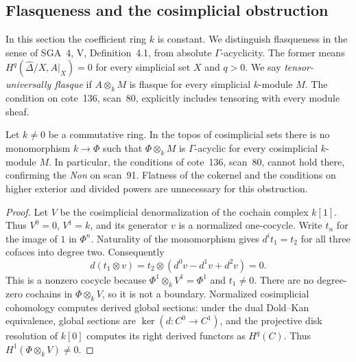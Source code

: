 \subsection{Flasqueness and the cosimplicial obstruction}

In this section the coefficient ring $k$ is constant. We distinguish
flasqueness in the sense of SGA~4, V, Definition~4.1, from absolute
$\Gamma$-acyclicity. The former means
$H^q(\widehat\Delta/X,A|_X)=0$ for every simplicial set $X$ and $q>0$.
We say \emph{tensor-universally flasque} if $A\otimes_k M$ is flasque
for every simplicial $k$-module $M$. The condition on cote~136,
scan~80, explicitly includes tensoring with every module sheaf.

\begin{theorem}\label{sa08:C01}
Let $k\ne0$ be a commutative ring. In the topos of cosimplicial sets
there is no monomorphism $k\to\Phi$ such that $\Phi\otimes_k M$ is
$\Gamma$-acyclic for every cosimplicial $k$-module $M$. In particular,
the conditions of cote~136, scan~80, cannot hold there, confirming the
\emph{Non} on scan~91. Flatness of the cokernel and the conditions on
higher exterior and divided powers are unnecessary for this obstruction.
\end{theorem}
\begin{proof}
Let $V$ be the cosimplicial denormalization of the cochain complex
$k[1]$. Thus $V^0=0$, $V^1=k$, and its generator $v$ is a normalized
one-cocycle. Write $t_n$ for the image of $1$ in $\Phi^n$.
Naturality of the monomorphism gives $d^i t_1=t_2$ for all three
cofaces into degree two. Consequently
\[
 d(t_1\otimes v)=t_2\otimes(d^0v-d^1v+d^2v)=0.
\]
This is a nonzero cocycle because $\Phi^1\otimes_k V^1=\Phi^1$ and
$t_1\ne0$. There are no degree-zero cochains in $\Phi\otimes_k V$,
so it is not a boundary. Normalized cosimplicial cohomology computes
derived global sections: under the dual Dold--Kan equivalence,
global sections are $\ker(d:C^0\to C^1)$, and the projective disk
resolution of $k[0]$ computes its right derived functors as $H^q(C)$.
Thus $H^1(\Phi\otimes_k V)\ne0$.
\end{proof}




